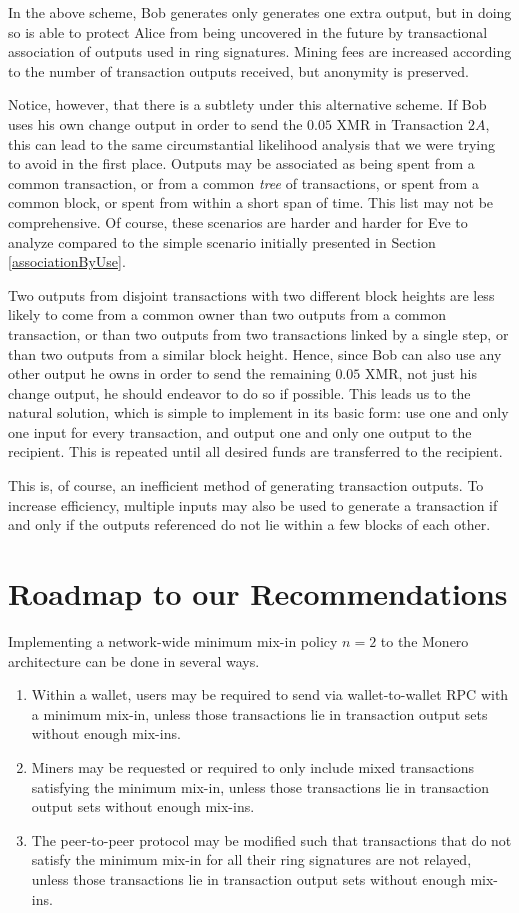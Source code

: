 \documentclass[12pt,english]{mrl}
\theoremstyle{definition}
\numberwithin{equation}{section}
\numberwithin{figure}{section}
\numberwithin{equation}{section}
\numberwithin{equation}{section}
\numberwithin{figure}{section}
\begin{document}
In the above scheme, Bob generates only generates one extra output, but in doing so is able to protect Alice from being uncovered in the future by transactional association of outputs used in ring signatures.  Mining fees are increased according to the number of transaction outputs received, but anonymity is preserved. 

Notice, however, that there is a subtlety under this alternative scheme. If Bob uses his own change output in order to send the $0.05$ XMR in Transaction $2A$, this can lead to the same circumstantial likelihood analysis that we were trying to avoid in the first place. Outputs may be associated as being spent from a common transaction, or from a common \textit{tree} of transactions, or spent from a common block, or spent from within a short span of time. This list may not be comprehensive. Of course, these scenarios are harder and harder for Eve to analyze compared to the simple scenario initially presented in Section \ref{associationByUse}. 

Two outputs from disjoint transactions with two different block heights are less likely to come from a common owner than two outputs from a common transaction, or than two outputs from two transactions linked by a single step, or than two outputs from a similar block height. Hence, since Bob can also use any other output he owns in order to send the remaining $0.05$ XMR, not just his change output, he should endeavor to do so if possible. This leads us to the natural solution, which is simple to implement in its basic form: use one and only one input for every transaction, and output one and only one output to the recipient. This is repeated until all desired funds are transferred to the recipient.

This is, of course, an inefficient method of generating transaction outputs. To increase efficiency, multiple inputs may also be used to generate a transaction if and only if the outputs referenced do not lie within a few blocks of each other.


\section{Roadmap to our Recommendations}\label{softwareImplementation}

Implementing a network-wide minimum mix-in policy $n=2$ to the Monero architecture can be done in several ways.
\begin{enumerate}[(1)]
\item Within a wallet, users may be required to send via wallet-to-wallet RPC with a minimum mix-in, unless those transactions lie in transaction output sets without enough mix-ins.
\item Miners may be requested or required to only include mixed transactions satisfying the minimum mix-in, unless those transactions lie in transaction output sets without enough mix-ins.
\item The peer-to-peer protocol may be modified such that transactions that do not satisfy the minimum mix-in for all their ring signatures are not relayed, unless those transactions lie in transaction output sets without enough mix-ins.
\end{enumerate}
\end{document}

